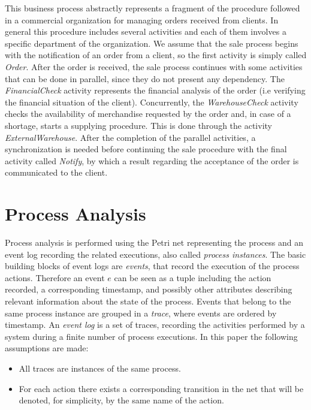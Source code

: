 \documentclass{llncs}
\begin{document}
This business process abstractly represents a fragment of the procedure followed in a commercial organization for managing orders received from clients. In general this procedure includes several activities and each of them involves a specific department of the organization. We assume that the sale process begins with the notification of an order from a client, so the first activity is simply called \emph{Order}. After the order is received, the sale process continues with some activities that can be done in parallel, since they do not present any dependency. The \emph{FinancialCheck} activity represents the financial analysis of the order (i.e verifying the financial situation of the client). Concurrently, the \emph{WarehouseCheck} activity checks the availability of merchandise requested by the order and, in case of a shortage, starts a supplying procedure. This is done through the activity \emph{ExternalWarehouse}. After the completion of the  parallel activities, a synchronization is needed before continuing the sale procedure with the final activity called \emph{Notify}, by which a result regarding the acceptance of the order is communicated to the client.

\section{Process Analysis}\label{Background}
Process analysis is performed using the Petri net representing the process and an event log recording the related executions, also called \emph{process instances}. The basic building blocks of event logs are \emph{events}, that record the execution of the process actions. Therefore an event $e$ can be seen as a tuple including the action recorded, a corresponding timestamp, and possibly other attributes describing relevant information about the state of the process. Events that belong to the same process instance are grouped in a {\itshape trace}, where events are ordered  by timestamp. An \emph{event log} is a set of traces, recording the activities performed by a system during a finite number of process executions.  In this paper the following assumptions are made:
\begin{itemize}
\item All traces are instances of the same process.
\item For each action there exists a corresponding transition in the net that will be denoted, for simplicity, by the same name of the action.
\end{itemize}
\end{document}
